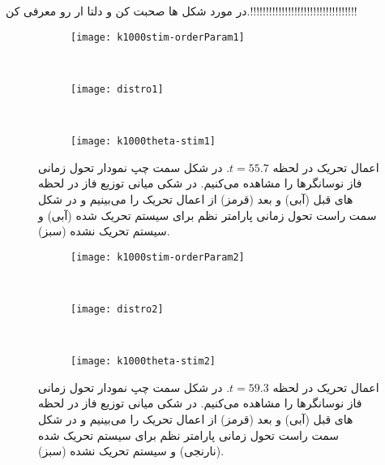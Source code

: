 در مورد شکل ها صحبت کن و دلتا ار رو معرفی کن.!!!!!!!!!!!!!!!!!!!!!!!!!!!!!!!!!!

\begin{figure}
     \centering
     \begin{subfigure}[t]{0.3\textwidth}
         \centering
         \texttt{[image: k1000stim-orderParam1]}
     \end{subfigure}
     \
     \begin{subfigure}[t]{0.2\textwidth}
         \centering
         \texttt{[image: distro1]}
     \end{subfigure}
     \
     \begin{subfigure}[t]{0.4\textwidth}
         \centering
         \texttt{[image: k1000theta-stim1]}
     \end{subfigure}
        \caption{
اعمال تحریک در لحظه 
$t=55.7$.
در شکل سمت چپ نمودار تحول زمانی فاز نوسانگرها را مشاهده می‌کنیم. در شکی میانی توزیع فاز در لحظه های قبل (آبی) و بعد (قرمز) از اعمال تحریک را می‌بینیم و در شکل سمت راست تحول زمانی پارامتر نظم برای سیستم تحریک شده (آبی) و سیستم تحریک نشده  (سبز).
         }
\end{figure}

\begin{figure}
     \centering
     \begin{subfigure}[t]{0.3\textwidth}
         \centering
         \texttt{[image: k1000stim-orderParam2]}
     \end{subfigure}
     \
     \begin{subfigure}[t]{0.2\textwidth}
         \centering
         \texttt{[image: distro2]}
     \end{subfigure}
     \
     \begin{subfigure}[t]{0.4\textwidth}
         \centering
         \texttt{[image: k1000theta-stim2]}
     \end{subfigure}
        \caption{
اعمال تحریک در لحظه 
$t=59.3$.
در شکل سمت چپ نمودار تحول زمانی فاز نوسانگرها را مشاهده می‌کنیم. در شکی میانی توزیع فاز در لحظه های قبل (آبی) و بعد (قرمز) از اعمال تحریک را می‌بینیم و در شکل سمت راست تحول زمانی پارامتر نظم برای سیستم تحریک شده (نارنجی) و سیستم تحریک نشده  (سبز).
         }
\end{figure}



